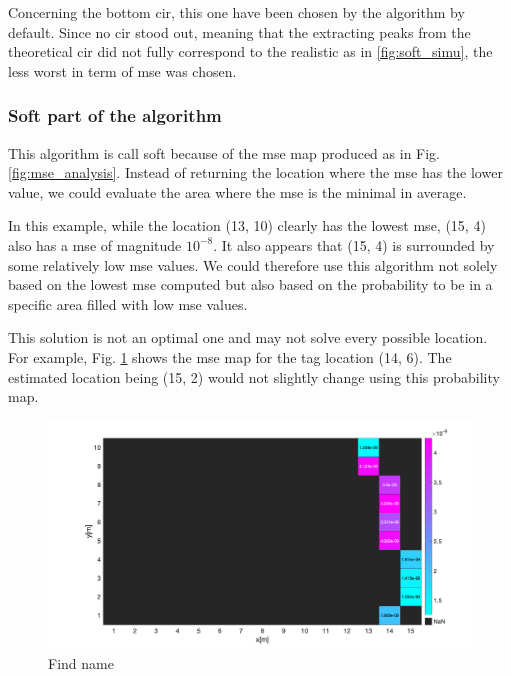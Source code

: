 Concerning the bottom \gls{cir}, this one have been chosen by the algorithm by default. Since no \gls{cir} stood out, meaning that the extracting peaks from the theoretical \gls{cir} did not fully correspond to the realistic as in \ref{fig:soft_simu}, the less worst in term of \gls{mse} was chosen.
\vspace{2mm}

\subsubsection{Soft part of the algorithm}

This algorithm is call soft because of the \gls{mse} map produced as in Fig. \ref{fig:mse_analysis}. Instead of returning the location where the \gls{mse} has the lower value, we could evaluate the area where the \gls{mse} is the minimal in average.
\vspace{2mm}

In this example, while the location (13, 10) clearly has the lowest \gls{mse}, (15, 4) also has a \gls{mse} of magnitude $10^{-8}$. It also appears that (15, 4) is surrounded by some relatively low \gls{mse} values. We could therefore use this algorithm not solely based on the lowest \gls{mse} computed but also based on the probability to be in a specific area filled with low \gls{mse} values.
\vspace{2mm}

This solution is not an optimal one and may not solve every possible location. For example, Fig. \ref{fig:again_an_image} shows the \gls{mse} map for the tag location (14, 6). The estimated location being (15, 2) would not slightly change using this probability map.

\begin{figure}[H]
\centering
\includegraphics[width=.9\linewidth]{Images/image_XXX.png}
\caption{Find name \label{fig:again_an_image}}
\end{figure}

